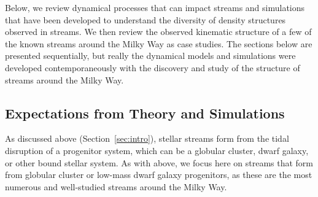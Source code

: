 \documentclass[final,5p,times,twocolumn,authoryear]{elsarticle}
\begin{document}
Below, we review dynamical processes that can impact streams and simulations that have
been developed to understand the diversity of density structures observed in streams.
We then review the observed kinematic structure of a few of the known streams around the
Milky Way as case studies.
The sections below are presented sequentially, but really the dynamical models and
simulations were developed contemporaneously with the discovery and study of the
structure of streams around the Milky Way.


\subsection{Expectations from Theory and Simulations}
\label{sec:structure-theory}


As discussed above (Section~\ref{sec:intro}), stellar streams form from the tidal
disruption of a progenitor system, which can be a globular cluster, dwarf galaxy, or
other bound stellar system.
As with above, we focus here on streams that form from globular cluster or low-mass
dwarf galaxy progenitors, as these are the most numerous and well-studied streams around
the Milky Way.
\end{document}

